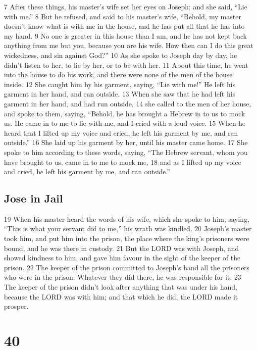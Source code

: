 {7} After these things, his master's wife set her eyes on Joseph; and
she said, ``Lie with me.'' {8} But he refused, and said to his master's
wife, ``Behold, my master doesn't know what is with me in the house, and
he has put all that he has into my hand. {9} No one is greater in this
house than I am, and he has not kept back anything from me but you,
because you are his wife. How then can I do this great wickedness, and
sin against God?'' {10} As she spoke to Joseph day by day, he didn't
listen to her, to lie by her, or to be with her. {11} About this time,
he went into the house to do his work, and there were none of the men of
the house inside. {12} She caught him by his garment, saying, ``Lie with
me!'' He left his garment in her hand, and ran outside. {13} When she
saw that he had left his garment in her hand, and had run outside, {14}
she called to the men of her house, and spoke to them, saying, ``Behold,
he has brought a Hebrew in to us to mock us. He came in to me to lie
with me, and I cried with a loud voice. {15} When he heard that I lifted
up my voice and cried, he left his garment by me, and ran outside.''
{16} She laid up his garment by her, until his master came home. {17}
She spoke to him according to these words, saying, ``The Hebrew servant,
whom you have brought to us, came in to me to mock me, {18} and as I
lifted up my voice and cried, he left his garment by me, and ran
outside.''

\hypertarget{jose-in-jail}{%
\subsection{Jose in Jail}\label{jose-in-jail}}

{19} When his master heard the words of his wife, which she spoke to
him, saying, ``This is what your servant did to me,'' his wrath was
kindled. {20} Joseph's master took him, and put him into the prison, the
place where the king's prisoners were bound, and he was there in
custody. {21} But the LORD was with Joseph, and showed kindness to him,
and gave him favour in the sight of the keeper of the prison. {22} The
keeper of the prison committed to Joseph's hand all the prisoners who
were in the prison. Whatever they did there, he was responsible for it.
{23} The keeper of the prison didn't look after anything that was under
his hand, because the LORD was with him; and that which he did, the LORD
made it prosper.

\hypertarget{section-39}{%
\section{40}\label{section-39}}

